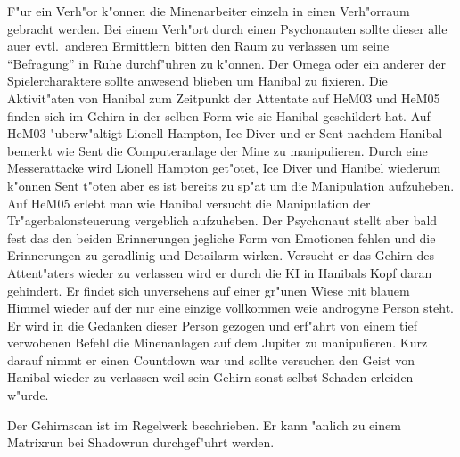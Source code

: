 F"ur ein Verh"or k"onnen die Minenarbeiter einzeln in einen Verh"orraum gebracht werden. Bei einem Verh"ort durch einen Psychonauten sollte dieser alle au\3er evtl.~anderen Ermittlern bitten den Raum zu verlassen um seine "`Befragung"' in Ruhe durchf"uhren zu k"onnen. Der Omega oder ein anderer der Spielercharaktere sollte anwesend blieben um Hanibal zu fixieren. Die Aktivit"aten von Hanibal zum Zeitpunkt der Attentate auf HeM03 und HeM05 finden sich im Gehirn in der selben Form wie sie Hanibal geschildert hat. Auf HeM03 "uberw"altigt Lionell Hampton, Ice Diver und er Sent nachdem Hanibal bemerkt wie Sent die Computeranlage der Mine zu manipulieren. Durch eine Messerattacke wird Lionell Hampton get"otet, Ice Diver und Hanibel wiederum k"onnen Sent t"oten aber es ist bereits zu sp"at um die Manipulation aufzuheben. Auf HeM05 erlebt man wie Hanibal versucht die Manipulation der Tr"agerbalonsteuerung vergeblich aufzuheben. Der Psychonaut stellt aber bald fest das den beiden Erinnerungen jegliche Form von Emotionen fehlen und die Erinnerungen zu geradlinig und Detailarm wirken. Versucht er das Gehirn des Attent"aters wieder zu verlassen wird er durch die KI in Hanibals Kopf daran gehindert. Er findet sich unversehens auf einer gr"unen Wiese mit blauem Himmel wieder auf der nur eine einzige vollkommen wei\3e androgyne Person steht. Er wird in die Gedanken dieser Person gezogen und erf"ahrt von einem tief verwobenen Befehl die Minenanlagen auf dem Jupiter zu manipulieren. Kurz darauf nimmt er einen Countdown war und sollte versuchen den Geist von Hanibal wieder zu verlassen weil sein Gehirn sonst selbst Schaden erleiden w"urde.

\begin{remarks}
	Der Gehirnscan ist im Regelwerk beschrieben. Er kann "anlich zu einem Matrixrun bei Shadowrun durchgef"uhrt werden.
\end{remarks}


